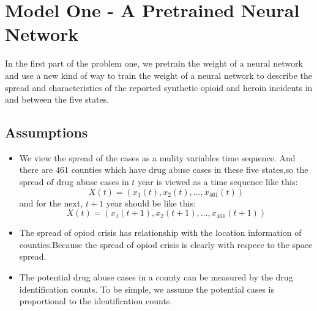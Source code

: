\documentclass{mcmthesis}
\begin{document}
\section{Model One - A Pretrained Neural Network}
	\par In the first part of the problem one, we pretrain the weight of a neural network and use a new kind of way to train the weight of a neural network to describe the spread and characteristics of the reported synthetic opioid and heroin incidents in and between the five states. 
	\subsection{Assumptions}
		\begin{itemize}
			\item We view the spread of the cases as a mulity variables time sequence. And there are $461$ counties which have drug abuse cases in these five states,so the spread of drug abuse cases in $t$ year is viewed as a time sequence like this: 
				$$X(t) = ( x_{1}(t), x_{2}(t), ..., x_{461}(t) )$$
				and for the next,  $t+1$ year should be like this:
				$$X(t) = ( x_{1}(t+1), x_{2}(t+1), ..., x_{461}(t+1) )$$
			\item The spread of opiod crisis has relationship with the location information of counties.Because the spread of opiod crisis is clearly with respece to the space spread.
			\item The potential drug abuse cases in a county can be measured by the drug identification counts. To be simple, we assume the potential cases is proportional to the identification counts. 
		\end{itemize}
\end{document}
